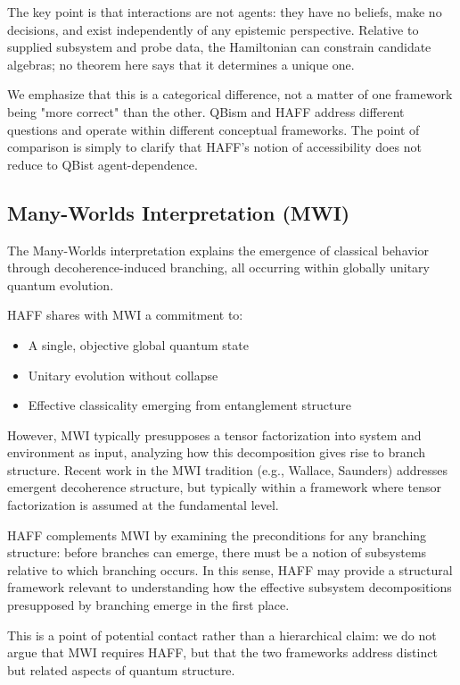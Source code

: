 \documentclass[12pt,a4paper]{article}
\begin{document}
The key point is that interactions are not agents: they have no beliefs, make no decisions, and exist independently of any epistemic perspective.  Relative to supplied subsystem and probe data, the Hamiltonian can constrain candidate algebras; no theorem here says that it determines a unique one.

We emphasize that this is a categorical difference, not a matter of one framework being "more correct" than the other. QBism and HAFF address different questions and operate within different conceptual frameworks. The point of comparison is simply to clarify that HAFF's notion of accessibility does not reduce to QBist agent-dependence.

\subsection{Many-Worlds Interpretation (MWI)}

The Many-Worlds interpretation \cite{Wallace2012} explains the emergence of classical behavior through decoherence-induced branching, all occurring within globally unitary quantum evolution.

HAFF shares with MWI a commitment to:
\begin{itemize}
\item A single, objective global quantum state
\item Unitary evolution without collapse
\item Effective classicality emerging from entanglement structure
\end{itemize}

However, MWI typically presupposes a tensor factorization into system and environment as input, analyzing how this decomposition gives rise to branch structure. Recent work in the MWI tradition (e.g., Wallace, Saunders) addresses emergent decoherence structure, but typically within a framework where tensor factorization is assumed at the fundamental level.

HAFF complements MWI by examining the preconditions for any branching structure: before branches can emerge, there must be a notion of subsystems relative to which branching occurs. In this sense, HAFF may provide a structural framework relevant to understanding how the effective subsystem decompositions presupposed by branching emerge in the first place.

This is a point of potential contact rather than a hierarchical claim: we do not argue that MWI requires HAFF, but that the two frameworks address distinct but related aspects of quantum structure.
\end{document}

